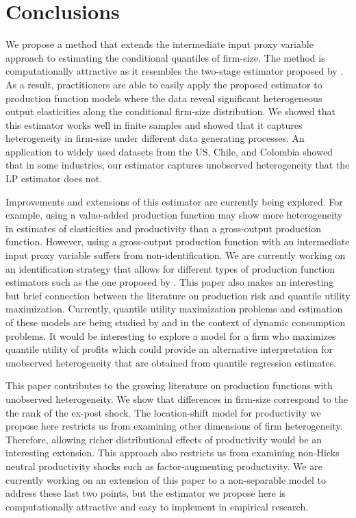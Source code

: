 \documentclass[11pt]{article}
\begin{document}
\section{Conclusions} \label{conclusion}

We propose a method that extends the intermediate input proxy variable approach to estimating the conditional quantiles of firm-size. The method is computationally attractive as it resembles the two-stage estimator proposed by \cite{Canay2011}. As a result, practitioners are able to easily apply the proposed estimator to production function models where the data reveal significant heterogeneous output elasticities along the conditional firm-size distribution. We showed that this estimator works well in finite samples and showed that it captures heterogeneity in firm-size under different data generating processes. An application to widely used datasets from the US, Chile, and Colombia showed that in some industries, our estimator captures unobserved heterogeneity that the LP estimator does not.

Improvements and extensions of this estimator are currently being explored. For example, using a value-added production function may show more heterogeneity in estimates of elasticities and productivity than a gross-output production function. However, using a gross-output production function with an intermediate input proxy variable suffers from non-identification. We are currently working on an identification strategy that allows for different types of production function estimators such as the one proposed by \cite{Gandhi2020}. This paper also makes an interesting but brief connection between the literature on production risk and quantile utility maximization. Currently, quantile utility maximization problems and estimation of these models are being studied by \cite{Castro2017} and \cite{qgmm} in the context of dynamic consumption problems. It would be interesting to explore a model for a firm who maximizes quantile utility of profits which could provide an alternative interpretation for unobserved heterogeneity that are obtained from quantile regression estimates.

This paper contributes to the growing literature on production functions with unobserved heterogeneity. We show that differences in firm-size correspond to the the rank of the ex-post shock. The location-shift model for productivity we propose here restricts us from examining other dimensions of firm heterogeneity. Therefore, allowing richer distributional effects of productivity would be an interesting extension. This approach also restricts us from examining non-Hicks neutral productivity shocks such as factor-augmenting productivity. We are currently working on an extension of this paper to a non-separable model to address these last two points, but the estimator we propose here is computationally attractive and easy to implement in empirical research.    
\end{document}
